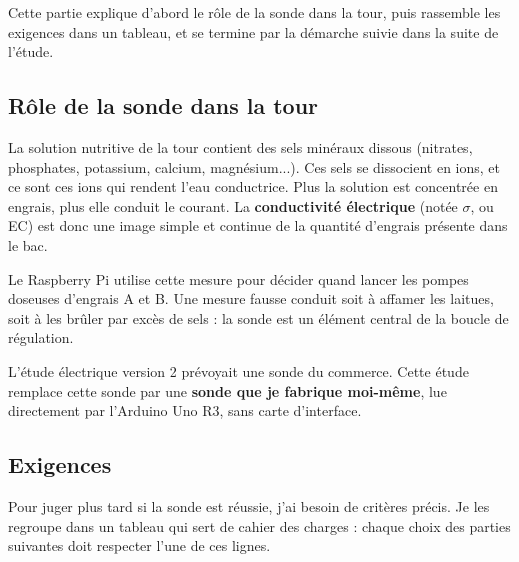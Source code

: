 \documentclass[11pt,a4paper]{article}
\begin{document}
Cette partie explique d'abord le rôle de la sonde dans la tour, puis rassemble les exigences dans un tableau, et se termine par la démarche suivie dans la suite de l'étude.


\subsection{Rôle de la sonde dans la tour}

La solution nutritive de la tour contient des sels minéraux dissous (nitrates, phosphates, potassium, calcium, magnésium...). Ces sels se dissocient en ions, et ce sont ces ions qui rendent l'eau conductrice. Plus la solution est concentrée en engrais, plus elle conduit le courant. La \textbf{conductivité électrique} (notée $\sigma$, ou EC) est donc une image simple et continue de la quantité d'engrais présente dans le bac.

Le Raspberry Pi utilise cette mesure pour décider quand lancer les pompes doseuses d'engrais A et B. Une mesure fausse conduit soit à affamer les laitues, soit à les brûler par excès de sels : la sonde est un élément central de la boucle de régulation.

L'étude électrique version 2 prévoyait une sonde du commerce. Cette étude remplace cette sonde par une \textbf{sonde que je fabrique moi-même}, lue directement par l'Arduino Uno R3, sans carte d'interface.

\subsection{Exigences}

Pour juger plus tard si la sonde est réussie, j'ai besoin de critères précis. Je les regroupe dans un tableau qui sert de cahier des charges : chaque choix des parties suivantes doit respecter l'une de ces lignes.
\end{document}
